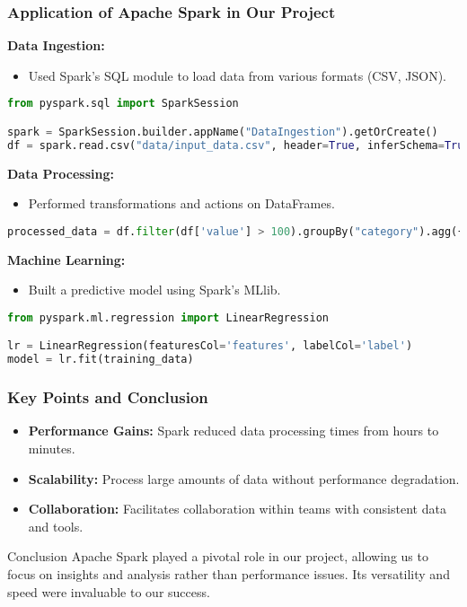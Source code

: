 \documentclass[aspectratio=169]{beamer}
\begin{document}
\begin{frame}[fragile]
    \frametitle{Application of Apache Spark in Our Project}
    
    \textbf{Data Ingestion:} 
    \begin{itemize}
        \item Used Spark's SQL module to load data from various formats (CSV, JSON).
    \end{itemize}
    \begin{lstlisting}[language=Python]
from pyspark.sql import SparkSession

spark = SparkSession.builder.appName("DataIngestion").getOrCreate()
df = spark.read.csv("data/input_data.csv", header=True, inferSchema=True)
    \end{lstlisting}
    
    \textbf{Data Processing:} 
    \begin{itemize}
        \item Performed transformations and actions on DataFrames.
    \end{itemize}
    \begin{lstlisting}[language=Python]
processed_data = df.filter(df['value'] > 100).groupBy("category").agg({"value": "sum"})
    \end{lstlisting}
    
    \textbf{Machine Learning:} 
    \begin{itemize}
        \item Built a predictive model using Spark's MLlib.
    \end{itemize}
    \begin{lstlisting}[language=Python]
from pyspark.ml.regression import LinearRegression

lr = LinearRegression(featuresCol='features', labelCol='label')
model = lr.fit(training_data)
    \end{lstlisting}
\end{frame}

\begin{frame}[fragile]
    \frametitle{Key Points and Conclusion}
    \begin{itemize}
        \item \textbf{Performance Gains:} Spark reduced data processing times from hours to minutes.
        \item \textbf{Scalability:} Process large amounts of data without performance degradation.
        \item \textbf{Collaboration:} Facilitates collaboration within teams with consistent data and tools.
    \end{itemize}

    \begin{block}{Conclusion}
        Apache Spark played a pivotal role in our project, allowing us to focus on insights and analysis rather than performance issues. Its versatility and speed were invaluable to our success.
    \end{block}
\end{frame}
\end{document}
